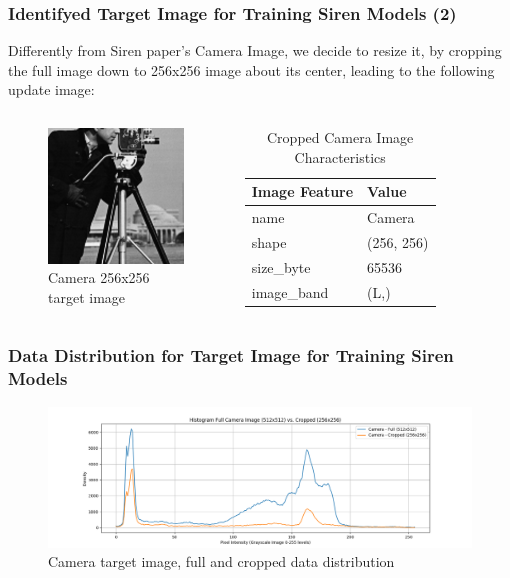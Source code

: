 



\begin{frame}
\frametitle{Identifyed Target Image for Training Siren Models (2)}
Differently from Siren paper's Camera Image, we decide to resize it, by cropping the full image down to 256x256 image about its center, leading to the following update image:


\begin{columns}
\begin{figure}
\includegraphics[scale=0.2]{slides/experiments/target-image/cropped_cameramen_256x256.png}
\caption{Camera 256x256 target image}
\end{figure}

\begin{table}
\begin{tabular}{ll}
\hline
          Image Feature & Value \\
\hline
       name &      Camera \\
      shape &  (256, 256) \\
  size\_byte &       65536 \\
 image\_band &        (L,) \\
\hline
\end{tabular}
\caption{Cropped Camera Image Characteristics }
\end{table}

\end{columns}
\end{frame}

\begin{frame}
\frametitle{Data Distribution for Target Image for Training Siren Models}

\begin{figure}
\includegraphics[scale=0.2]{slides/experiments/target-image/mixing_image_hist.png}
\caption{Camera target image, full and cropped data distribution}
\end{figure}

\end{frame}


